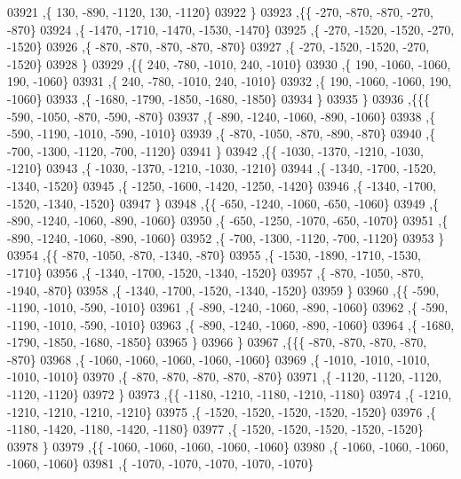 \begin{DoxyCode}
03921     ,\{   130,  -890, -1120,   130, -1120\}
03922     \}
03923    ,\{\{  -270,  -870,  -870,  -270,  -870\}
03924     ,\{ -1470, -1710, -1470, -1530, -1470\}
03925     ,\{  -270, -1520, -1520,  -270, -1520\}
03926     ,\{  -870,  -870,  -870,  -870,  -870\}
03927     ,\{  -270, -1520, -1520,  -270, -1520\}
03928     \}
03929    ,\{\{   240,  -780, -1010,   240, -1010\}
03930     ,\{   190, -1060, -1060,   190, -1060\}
03931     ,\{   240,  -780, -1010,   240, -1010\}
03932     ,\{   190, -1060, -1060,   190, -1060\}
03933     ,\{ -1680, -1790, -1850, -1680, -1850\}
03934     \}
03935    \}
03936   ,\{\{\{  -590, -1050,  -870,  -590,  -870\}
03937     ,\{  -890, -1240, -1060,  -890, -1060\}
03938     ,\{  -590, -1190, -1010,  -590, -1010\}
03939     ,\{  -870, -1050,  -870,  -890,  -870\}
03940     ,\{  -700, -1300, -1120,  -700, -1120\}
03941     \}
03942    ,\{\{ -1030, -1370, -1210, -1030, -1210\}
03943     ,\{ -1030, -1370, -1210, -1030, -1210\}
03944     ,\{ -1340, -1700, -1520, -1340, -1520\}
03945     ,\{ -1250, -1600, -1420, -1250, -1420\}
03946     ,\{ -1340, -1700, -1520, -1340, -1520\}
03947     \}
03948    ,\{\{  -650, -1240, -1060,  -650, -1060\}
03949     ,\{  -890, -1240, -1060,  -890, -1060\}
03950     ,\{  -650, -1250, -1070,  -650, -1070\}
03951     ,\{  -890, -1240, -1060,  -890, -1060\}
03952     ,\{  -700, -1300, -1120,  -700, -1120\}
03953     \}
03954    ,\{\{  -870, -1050,  -870, -1340,  -870\}
03955     ,\{ -1530, -1890, -1710, -1530, -1710\}
03956     ,\{ -1340, -1700, -1520, -1340, -1520\}
03957     ,\{  -870, -1050,  -870, -1940,  -870\}
03958     ,\{ -1340, -1700, -1520, -1340, -1520\}
03959     \}
03960    ,\{\{  -590, -1190, -1010,  -590, -1010\}
03961     ,\{  -890, -1240, -1060,  -890, -1060\}
03962     ,\{  -590, -1190, -1010,  -590, -1010\}
03963     ,\{  -890, -1240, -1060,  -890, -1060\}
03964     ,\{ -1680, -1790, -1850, -1680, -1850\}
03965     \}
03966    \}
03967   ,\{\{\{  -870,  -870,  -870,  -870,  -870\}
03968     ,\{ -1060, -1060, -1060, -1060, -1060\}
03969     ,\{ -1010, -1010, -1010, -1010, -1010\}
03970     ,\{  -870,  -870,  -870,  -870,  -870\}
03971     ,\{ -1120, -1120, -1120, -1120, -1120\}
03972     \}
03973    ,\{\{ -1180, -1210, -1180, -1210, -1180\}
03974     ,\{ -1210, -1210, -1210, -1210, -1210\}
03975     ,\{ -1520, -1520, -1520, -1520, -1520\}
03976     ,\{ -1180, -1420, -1180, -1420, -1180\}
03977     ,\{ -1520, -1520, -1520, -1520, -1520\}
03978     \}
03979    ,\{\{ -1060, -1060, -1060, -1060, -1060\}
03980     ,\{ -1060, -1060, -1060, -1060, -1060\}
03981     ,\{ -1070, -1070, -1070, -1070, -1070\}

\end{DoxyCode}
